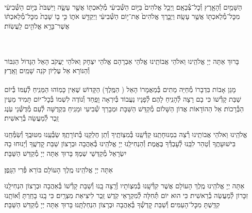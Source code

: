 \documentclass[twoside, openany, parskip=half, 11pt]{book}
\begin{document}
\tachanunim


\label{vayachulu}
\\
 הַשָּׁמַ֥יִם וְ֯הָאָ֖רֶץ וְ֯כׇל־צְ֯בָאָֽם׃ וַיְכַ֤ל אֱלֹהִים֙ בַּיּ֣וֹם הַשְּׁ֯בִיעִ֔י מְ֯לַאכְתּ֖וֹ אֲשֶׁ֣ר עָשָׂ֑ה וַיִּשְׁבֹּת֙ בַּיּ֣וֹם הַשְּׁ֯בִיעִ֔י מִכׇּל־מְ֯לַאכְתּ֖וֹ אֲשֶׁ֥ר עָשָֽׂה׃ וַיְבָ֤רֶךְ אֱלֹהִים֙ אֶת־י֣וֹם הַשְּׁ֯בִיעִ֔י וַיְקַדֵּ֖שׁ אֹת֑וֹ כִּ֣י ב֤וֹ שָׁבַת֙ מִכׇּל־מְ֯לַאכְתּ֔וֹ אֲשֶׁר־בָּרָ֥א אֱלֹהִ֖ים לַֽעֲשֽׂוֹת׃


\\
\\
בָּרוּךְ אַתָּה יְיָ אֱלֹהֵֽינוּ וֵאלֹהֵי אֲבוֹתֵֽינוּ אֱלֹהֵי אַבְרָהָם אֱלֹהֵי יִצְחָק וֵאלֹהֵי יַעֲקֹב הָאֵל הַגָּדוֹל הַגִּבּוֹר וְ֯הַנּוֹרָא אֵל עֶלְיוֹן קֹנֵה שָׁמַֽיִם וָאָֽרֶץ׃\\
\\

מָגֵן אָבוֹת בִּדְבָרוֹ מְ֯חַיֵּה מֵתִים בְּ֯מַאֲמָרוֹ הָאֵל
( הַמֶּֽלֶךְ)
הַקָּדוֹשׁ שֶׁאֵין כָּמֽוֹהוּ הַמֵּנִֽיחַ לְ֯עַמּוֹ בְּ֯יוֹם שַׁבַּת קָדְ֯שׁוֹ כִּי בָם רָצָה לְ֯הָנִֽיחַ לָהֶם׃ לְ֯פָנָיו נַעֲבוֹד בְּ֯יִרְאָה וָפַֽחַד וְ֯נוֹדֶה לִשְׁמוֹ בְּ֯כׇל־יוֹם תָּמִיד מֵעֵין הַבְּ֯רָכוֹת׃ אֵל הַהוֹדָאוֹת אֲדוֹן הַשָּׁלוֹם מְ֯קַדֵּשׁ הַשַּׁבָּת וּמְבָרֵךְ שְׁ֯בִיעִי וּמֵנִֽיחַ בִּקְדֻשָּׁה לְ֯עַם מְ֯דֻשְּׁ֯נֵי עֹֽנֶג זֵֽכֶר לְ֯מַעֲשֵׂה בְ֯רֵאשִׁית׃

אֱלֹהֵֽינוּ וֵאלֹהֵי אֲבוֹתֵֽינוּ רְ֯צֵה בִמְנוּחָתֵֽנוּ׃ קַדְּ֯שֵֽׁנוּ בְּ֯מִצְוֹתֶֽיךָ וְ֯תֵן חֶלְקֵֽנוּ בְּ֯תוֹרָתֶֽךָ׃ שַׂבְּ֯עֵֽנוּ מִטּוּבֶֽךָ וְ֯שַׂמְּ֯חֵֽנוּ בִּישׁוּעָתֶֽךָ וְ֯טַהֵר לִבֵּֽנוּ לְ֯עׇבְדְּ֯ךָ בֶּאֱמֶת׃ וְ֯הַנְחִילֵֽנוּ יְיָ אֱלֹהֵֽינוּ בְּ֯אַהֲבָה וּבְרָצוֹן שַׁבַּת קׇדְשֶֽׁךָ וְ֯יָנוּחוּ בָהּ יִשְׂרָאֵל מְ֯קַדְּשֵׁי שְׁמֶךָ׃ בָּרוּךְ אַתָּה יְיָ מְ֯קַדֵּשׁ הַשַּׁבָּת׃

\fullkaddish


אַתָּה יְיָ אֱלֹהֵֽינוּ מֶֽלֶךְ הָעוֹלָם בּוֹרֵא פְּ֯רִי הַגָּֽפֶן׃

אַתָּה יְיָ אֱלֹהֵֽינוּ מֶֽלֶךְ הָעוֹלָם אֲשֶׁר קִדְּ֯שָֽׁנוּ בְּ֯מִצְוֹתָיו וְ֯רָֽצָה בָֽנוּ וְ֯שַׁבַּת קָדְ֯שׁוֹ בְּ֯אַהֲבָה וּבְרָצוֹן הִנְחִילָֽנוּ זִכָּרוֹן לְ֯מַעֲשֵׂה בְ֯רֵאשִׁית׃ כִּי הוּא יוֹם תְּ֯חִלָּה לְ֯מִקְרָאֵי קֹֽדֶשׁ זֵֽכֶר לִיצִיאַת מִצְרָֽיִם׃ כִּי בָֽנוּ בָחַֽרְתָּ וְ֯אוֹתָֽנוּ קִדַּֽשְׁתָּ מִכׇּל־הָעַמִּים׃ וְ֯שַׁבַּת קׇדְשְׁ֯ךָ בְּ֯אַהֲבָה וּבְרָצוֹן הִנְחַלְתָּֽנוּ׃ בָּרוּךְ אַתָּה יְיָ מְ֯קַדֵּשׁ הַשַּׁבָּת׃
\end{document}
